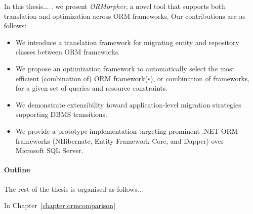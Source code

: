 In this thesis... , we present \emph{ORMorpher}, a novel tool that supports both translation and optimization across ORM frameworks. Our contributions are as follows:
\begin{itemize}
    \item We introduce a translation framework for migrating entity and repository classes between ORM frameworks.
    \item We propose an optimization framework to automatically select the most efficient (combination of) ORM framework(s), or combination of frameworks, for a given set of queries and resource constraints.
    \item We demonstrate extensibility toward application-level migration strategies supporting DBMS transitions.
    \item We provide a prototype implementation targeting prominent .NET ORM frameworks (NHibernate, Entity Framework Core, and Dapper) over Microsoft SQL Server.
\end{itemize}

\paragraph{Outline} The rest of the thesis is organised as follows...

In Chapter~\ref{chapter:ormcomparison}